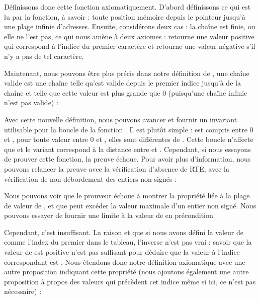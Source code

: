 Définissons donc cette fonction axiomatiquement. D'abord définissons ce qui
est lu par la fonction, à savoir : toute position mémoire depuis le pointeur
jusqu'à une plage infinie d'adresses. Ensuite, considérons deux cas : la chaîne
est finie, ou elle ne l'est pas, ce qui nous amène à deux axiomes :
 retourne une valeur positive qui correspond à l'indice
du premier caractère  et retourne une valeur
négative s'il n'y a pas de tel caractère.






Maintenant, nous pouvons être plus précis dans notre définition de
, une chaîne valide est une
chaîne telle qu'est valide depuis le premier indice jusqu'à 
de la chaîne et telle que cette valeur est plus grande que 0 (puisqu'une
chaîne infinie n'est pas valide) :




Avec cette nouvelle définition, nous pouvons avancer et fournir un invariant
utilisable pour la boucle de la fonction . Il est plutôt
simple :  est compris entre 0 et , pour
toute valeur entre 0 et , elles sont différentes de
. Cette boucle n'affecte que 
et le variant correspond à la distance entre  et
. Cependant, si nous essayons de prouver cette fonction,
la preuve échoue. Pour avoir plus d'information, nous pouvons relancer la
preuve avec la vérification d'absence de RTE, avec la vérification de
non-débordement des entiers non signés :





Nous pouvons voir que le prouveur échoue à montrer la propriété liée à la
plage de valeur de , et que  peut excéder la
valeur maximale d'un entier non signé. Nous pouvons essayer de fournir une
limite à la valeur de  en précondition.




Cependant, c'est insuffisant. La raison et que si nous avons défini la
valeur de  comme l'index du premier
 dans le tableau, l'inverse n'est pas
vrai : savoir que la valeur de  est positive n'est
pas suffisant pour déduire que la valeur à l'indice correspondant est
. Nous étendons donc notre définition
axiomatique avec une autre proposition indiquant cette propriété (nous
ajoutons également une autre proposition à propos des valeurs qui
précèdent cet indice même si ici, ce n'est pas nécessaire) :




